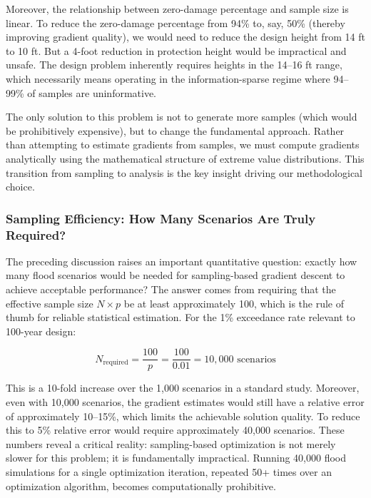 \documentclass[review]{elsarticle}
\begin{document}
Moreover, the relationship between zero-damage percentage and sample size is linear. To reduce the zero-damage percentage from 94\% to, say, 50\% (thereby improving gradient quality), we would need to reduce the design height from 14 ft to 10 ft. But a 4-foot reduction in protection height would be impractical and unsafe. The design problem inherently requires heights in the 14--16 ft range, which necessarily means operating in the information-sparse regime where 94--99\% of samples are uninformative.

The only solution to this problem is not to generate more samples (which would be prohibitively expensive), but to change the fundamental approach. Rather than attempting to estimate gradients from samples, we must compute gradients analytically using the mathematical structure of extreme value distributions. This transition from sampling to analysis is the key insight driving our methodological choice.

\subsubsection{Sampling Efficiency: How Many Scenarios Are Truly Required?}

The preceding discussion raises an important quantitative question: exactly how many flood scenarios would be needed for sampling-based gradient descent to achieve acceptable performance? The answer comes from requiring that the effective sample size $N \times p$ be at least approximately 100, which is the rule of thumb for reliable statistical estimation. For the 1\% exceedance rate relevant to 100-year design:

\begin{equation}
N_{\text{required}} = \frac{100}{p} = \frac{100}{0.01} = 10,000 \text{ scenarios}
\end{equation}

This is a 10-fold increase over the 1,000 scenarios in a standard study. Moreover, even with 10,000 scenarios, the gradient estimates would still have a relative error of approximately 10--15\%, which limits the achievable solution quality. To reduce this to 5\% relative error would require approximately 40,000 scenarios. These numbers reveal a critical reality: sampling-based optimization is not merely slower for this problem; it is fundamentally impractical. Running 40,000 flood simulations for a single optimization iteration, repeated 50+ times over an optimization algorithm, becomes computationally prohibitive.
\end{document}
